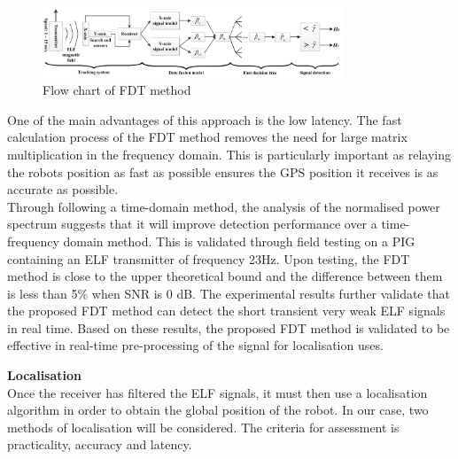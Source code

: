 \documentclass[11pt]{article}		%
\begin{document}
	         \begin{figure}[h]
				\centering
				\includegraphics[width=0.8\textwidth]{FDT.png}
				\caption{Flow chart of FDT method }
				\label{FDTFlowchart}
			\end{figure}
			
			One of the main advantages of this approach is the low latency. 
			The fast calculation process of the FDT method removes the need for large matrix multiplication in the frequency domain. 
			This is particularly important as relaying the robots position as fast as possible ensures the GPS position it receives is as accurate as possible. 
			\\
	    	\hspace*{3ex}Through following a time-domain method, the analysis of the normalised power spectrum suggests that it will improve detection performance over a time-frequency domain method. 
	    	This is validated through field testing on a PIG containing an ELF transmitter of frequency 23Hz. 
	    	Upon testing, the FDT method is close to the upper theoretical bound and the difference between them is less than 5\%  when SNR is 0 dB.
	    	The experimental results further validate that the proposed FDT method can detect the short transient very weak ELF signals in real time. 
	    	Based on these results, the proposed FDT method is validated to be effective in real-time pre-processing of the signal for localisation uses.
			
			\textbf{Localisation}\\
			Once the receiver has filtered the ELF signals, it must then use a localisation algorithm in order to obtain the global position of the robot. In our case, two methods of localisation will be considered. The criteria for assessment is practicality, accuracy and latency. 
			
\end{document}
